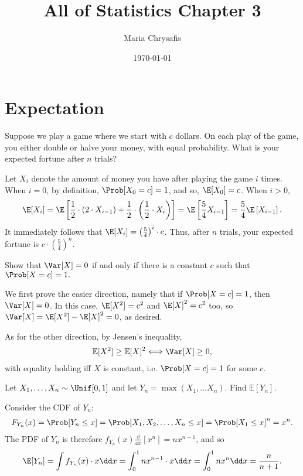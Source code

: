 \documentclass[a4paper]{article}
\author{Maria Chrysafis}
\date{\today}
\title{All of Statistics Chapter 3}
\begin{document}
\maketitle
\section{Expectation}
\begin{Exercise}
	Suppose we play a game where we start with $c$ dollars. On each play of the game, you either double or halve your money, with equal probability. What is your expected fortune after $n$ trials?
\end{Exercise}
\begin{Solution}
	Let $X_i$ denote the amount of money you have after playing the game $i$ times. When $i = 0$, by definition, $\Prob[X_0 = c] = 1$, and so, $\E[X_0] = c$. When $i > 0$, 
	\begin{align*}
		\E[X_i] = \E \left[ \frac{1}{2} \cdot \left(2 \cdot X_{i - 1} \right) + \frac{1}{2} \cdot \left( \frac{1}{2} \cdot X_i \right) \right] = \E \left[\frac{5}{4} X_{i - 1} \right] = \frac{5}{4} \E \left[ X_{i - 1} \right].
	\end{align*}
	It immediately follows that $\E[X_i] = \left( \frac{5}{4} \right)^i \cdot c$. Thus, after $n$ trials, your expected fortune is $c \cdot \left( \frac{5}{4}\right)^n$.
\end{Solution}
\begin{Exercise}
	Show that $\Var[X] = 0$ if and only if there is a constant $c$ such that $\Prob[X = c]= 1.$
\end{Exercise}
\begin{Solution}
	We first prove the easier direction, namely that if $\Prob[X = c] = 1$, then $\Var[X] = 0$. In this case, $\E[X^2] = c^2$ and $\E[X]^2 = c^2$ too, so $\Var[X] = \E[X^2] - \E[X]^2 = 0$, as desired. 

	As for the other direction, by Jensen's inequality,
	\begin{align*}
		\mathbb{E}[X^2] \ge \mathbb{E}[X]^2 \Longleftrightarrow \Var[X] \ge 0,
	\end{align*}
	with equality holding iff $X$ is constant, i.e. $\Prob[X = c] = 1$ for some $c$. 
\end{Solution}
\begin{Exercise}
	Let $X_1, \ldots , X_n \sim \Unif[0, 1]$ and let $Y_n = \max \left( X_1, \ldots X_n \right)$. Find $\mathbb{E}[Y_n]$.
\end{Exercise}
\begin{Solution}
	Consider the CDF of $Y_n$:
	\begin{align*}
		F_{Y_n}(x) = \Prob[Y_n \le x] = \Prob [X_1, X_2, \ldots, X_n \le x] = \Prob [X_1 \le x]^n = x^n.
	\end{align*}
	The PDF of $Y_n$ is therefore $f_{Y_n}(x)\frac{\dd}{\dd x} \left[ x^n \right] = n x^{n - 1}$, and so
	\begin{align*}
		\E[Y_n] = \int f_{Y_n}(x) \cdot x \dd x = \int_0^{1} n x^{n - 1} \cdot x \dd x= \int_0^1 nx^n \dd x = \frac{n}{n + 1}.
	\end{align*}
\end{Solution}
\end{document}
